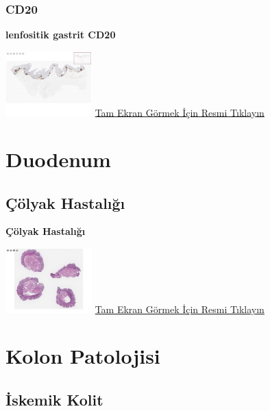 \documentclass[
  letterpaper,
  DIV=11,
  numbers=noendperiod]{scrreprt}
\begin{document}
\hypertarget{cd20}{%
\subsection{CD20}\label{cd20}}

\textbf{lenfositik gastrit CD20}

\href{https://images.patolojiatlasi.com/lymphocytic-gastritis/CD20.html}{\includegraphics[width=0.25\textwidth,height=\textheight]{./screenshots/thumbnail_lymphocytic-gastritisCD20.png}}
\href{https://images.patolojiatlasi.com/lymphocytic-gastritis/CD20.html}{Tam
Ekran Görmek İçin Resmi Tıklayın}

\hypertarget{sec-duodenum}{%
\chapter{Duodenum}\label{sec-duodenum}}

\hypertarget{sec-colyak-hastaligi}{%
\section{Çölyak Hastalığı}\label{sec-colyak-hastaligi}}

\textbf{Çölyak Hastalığı}

\href{https://images.patolojiatlasi.com/celiac-disease/HE.html}{\includegraphics[width=0.25\textwidth,height=\textheight]{./screenshots/thumbnail_celiac-disease.png}}
\href{https://images.patolojiatlasi.com/celiac-disease/HE.html}{Tam
Ekran Görmek İçin Resmi Tıklayın}

\hypertarget{sec-kolon-patolojisi}{%
\chapter{Kolon Patolojisi}\label{sec-kolon-patolojisi}}

\hypertarget{sec-iskemik-kolit}{%
\section{İskemik Kolit}\label{sec-iskemik-kolit}}
\end{document}
